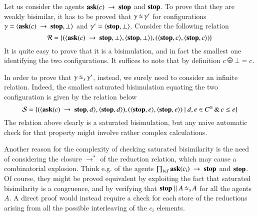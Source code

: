 \documentclass[main.tex]{subfiles}
\begin{document}
\begin{example}
\label{ex:barbvslabbis1}
Let us consider the agents ${\bf ask}(c) \ \rightarrow \ \mbox{{\bf stop}}$ and ${\mbox{{\bf stop}}}$. To prove that they are weakly bisimilar, it has to be proved that 
$\gamma\,\dot{\approx}\,\gamma'$ for configurations $\gamma = \langle {\bf ask}(c) \ \rightarrow \ \mbox{{\bf stop}},\bot \rangle$ and $\gamma' = \langle \mbox{{\bf stop}},\bot \rangle$.
%
Consider the following relation
\[ \mathcal{R} = \{ (\langle {\bf ask}(c) \ \rightarrow \ \mbox{{\bf stop}},\bot \rangle, \langle \mbox{{\bf stop}},\bot \rangle), (\langle \mbox{{\bf stop}},c \rangle, \langle \mbox{{\bf stop}},c \rangle)\} \]
It is quite easy to prove that it is a bisimulation, and in fact the smallest one identifying the two configurations. It suffices to note that 
by definition $c \odiv \bot = c$.

In order to prove that $\gamma\,\dot{\approx}_{s}\,\gamma'$, instead, we surely need to consider an infinite relation. Indeed, the smallest saturated bisimulation equating the 
two configuration is given by the relation below
\[
\mathcal{S} = \{ (\langle {\bf ask}(c) \ \rightarrow \ \mbox{{\bf stop}},d \rangle, \langle \mbox{{\bf stop}},d \rangle), (\langle \mbox{{\bf stop}},e \rangle, \langle \mbox{{\bf stop}},e \rangle) \ |\ d, e \in C^\otimes\, \&\, c \leq e\} 
\]
The relation above clearly is a saturated bisimulation, but any naive automatic check for that property might involve rather complex 
calculations.

\end{example}

Another reason for the complexity of checking saturated bisimilarity is the need of considering 
the closure $\longrightarrow^*$ of the reduction relation, which may cause a combinatorial explosion.
Think e.g. of the agents $\prod_{i \in I} {\bf ask}(c_i) \ \rightarrow \ \mbox{{\bf stop}}$ and $\mbox{{\bf stop}}$. Of course, they might be proved equivalent 
by exploiting the fact that saturated bisimilarity is a congruence, and by verifying that $\mbox{{\bf stop}} \parallel A \,\dot{\approx}_{s}\, A $ for all 
the agents $A$.
%
A direct proof would instead require a check for each store of the reductions arising from all the possible interleaving of the $c_i$
elements.
\end{document}
